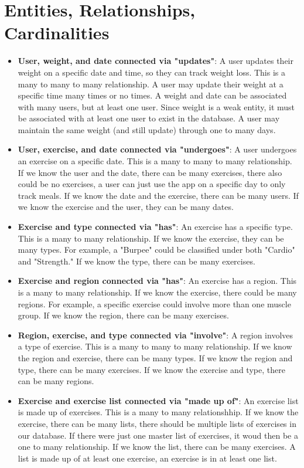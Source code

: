 \documentclass{report}
\begin{document}
    \pagebreak 
    \section{Entities, Relationships, Cardinalities}
    \begin{itemize}
        \item \textbf{User, weight, and date connected via "updates"}: A user updates their weight on a specific date and time, so they can track weight loss. This is a many to many to many relationship. A user may update their weight at a specific time many times or no times. A weight and date can be associated with many users, but at least one user. Since weight is a weak entity, it must be associated with at least one user to exist in the database. A user may maintain the same weight (and still update) through one to many days.
        \item \textbf{User, exercise, and date connected via "undergoes"}: A user undergoes an exercise on a specific date. This is a many to many to many relationship. If we know the user and the date, there can be many exercises, there also could be no exercises, a user can just use the app on a specific day to only track meals. If we know the date and the exercise, there can be many users. If we know the exercise and the user, they can be many dates.
        \item \textbf{Exercise and type connected via "has"}: An exercise has a specific type. This is a many to many relationship. If we know the exercise, they can be many types. For example, a "Burpee" could be classified under both "Cardio" and "Strength." If we know the type, there can be many exercises.
        \item \textbf{Exercise and region connected via "has"}: An exercise has a region. This is a many to many relationship. If we know the exercise, there could be many regions. For example, a specific exercise could involve more than one muscle group. If we know the region, there can be many exercises. 
        \item \textbf{Region, exercise, and type connected via "involve"}: A region involves a type of exercise. This is a many to many to many relationship. If we know the region and exercise, there can be many types. If we know the region and type, there can be many exercises. If we know the exercise and type, there can be many regions.
        \item \textbf{Exercise and exercise list connected via "made up of"}: An exercise list is made up of exercises. This is a many to many relationshhip. If we know the exercise, there can be many lists, there should be multiple lists of exercises in our database. If there were just one master list of exercises, it woud then be a one to many relationship. If we know the list, there can be many exercises. A list is made up of at least one exercise, an exercise is in at least one list.

\end{itemize}
\end{document}
